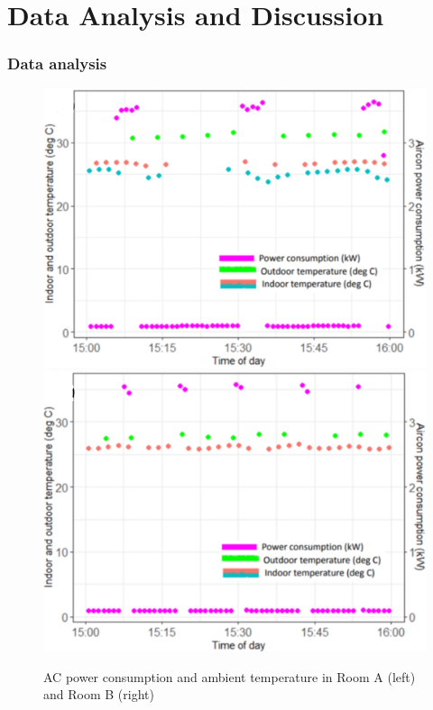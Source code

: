 \documentclass[aspectratio=169]{beamer}
\begin{document}
\section{Data Analysis and Discussion}
\begin{frame}
    \frametitle{Data analysis}
    \begin{figure}
        \includegraphics[scale = 0.19]{pic/ac_power_A.png}
        \includegraphics[scale = 0.19]{pic/ac_power_B.png}
        \caption{\footnotesize AC power consumption and ambient temperature in Room A (left) and Room B (right)}
    \end{figure}
\end{frame}
\end{document}
